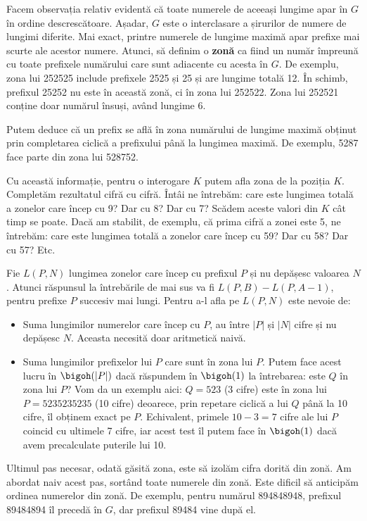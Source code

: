 Facem observația relativ evidentă că toate numerele de aceeași lungime apar în $G$ în ordine descrescătoare. Așadar, $G$ este o interclasare a șirurilor de numere de lungimi diferite. Mai exact, printre numerele de lungime maximă apar prefixe mai scurte ale acestor numere. Atunci, să definim o \textbf{zonă} ca fiind un număr împreună cu toate prefixele numărului care sunt adiacente cu acesta în $G$. De exemplu, zona lui 252525 include prefixele 2525 și 25 și are lungime totală 12. În schimb, prefixul 25252 nu este în această zonă, ci în zona lui 252522. Zona lui 252521 conține doar numărul însuși, având lungime 6.

Putem deduce că un prefix se află în zona numărului de lungime maximă obținut prin completarea ciclică a prefixului până la lungimea maximă. De exemplu, 5287 face parte din zona lui 528752.

Cu această informație, pentru o interogare $K$ putem afla zona de la poziția $K$. Completăm rezultatul cifră cu cifră. Întâi ne întrebăm: care este lungimea totală a zonelor care încep cu 9? Dar cu 8? Dar cu 7? Scădem aceste valori din $K$ cât timp se poate. Dacă am stabilit, de exemplu, că prima cifră a zonei este 5, ne întrebăm: care este lungimea totală a zonelor care încep cu 59? Dar cu 58? Dar cu 57? Etc.

Fie $L(P, N)$ lungimea zonelor care încep cu prefixul $P$ și nu depășesc valoarea $N$. Atunci răspunsul la întrebările de mai sus va fi $L(P, B) - L(P, A-1)$, pentru prefixe $P$ succesiv mai lungi. Pentru a-l afla pe $L(P,N)$ este nevoie de:

\begin{itemize}
  \item Suma lungimilor numerelor care încep cu $P$, au între $|P|$ și $|N|$ cifre și nu depășesc $N$. Aceasta necesită doar aritmetică naivă.
  \item Suma lungimilor prefixelor lui $P$ care sunt în zona lui $P$. Putem face acest lucru în $\bigoh(|P|)$ dacă răspundem în $\bigoh(1)$ la întrebarea: este $Q$ în zona lui $P$? Vom da un exemplu aici: $Q=523$ (3 cifre) este în zona lui $P = 5235235235$ (10 cifre) deoarece, prin repetare ciclică a lui $Q$ până la 10 cifre, îl obținem exact pe $P$. Echivalent, primele $10-3=7$ cifre ale lui $P$ coincid cu ultimele 7 cifre, iar acest test îl putem face în $\bigoh(1)$ dacă avem precalculate puterile lui 10.
\end{itemize}

Ultimul pas necesar, odată găsită zona, este să izolăm cifra dorită din zonă. Am abordat naiv acest pas, sortând toate numerele din zonă. Este dificil să anticipăm ordinea numerelor din zonă. De exemplu, pentru numărul 894848948, prefixul 89484894 îl precedă în $G$, dar prefixul 89484 vine după el.

